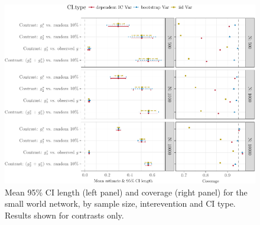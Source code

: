 \documentclass[english]{article}\usepackage[]{graphicx}\usepackage[]{color}
\makeatletter
\def\maxwidth{ %
  \ifdim\Gin@nat@width>\linewidth
    \linewidth
  \else
    \Gin@nat@width
  \fi
}
\newenvironment{knitrout}{}{} %
\theoremstyle{plain}
\theoremstyle{plain}
\makeatother
\begin{document}
\begin{knitrout}\footnotesize
{}\color{fgcolor}\begin{figure}

{\centering \includegraphics[width=\maxwidth]{TablesFigs/knitR-CIres_ATE_smwld-1} 

}

\caption[Mean 95\% CI length (left panel) and coverage (right panel) for the small world network, by sample size, interevention and CI type]{Mean 95\% CI length (left panel) and coverage (right panel) for the small world network, by sample size, interevention and CI type. Results shown for contrasts only.}\label{fig:CIres.ATE.smwld}
\end{figure}


\end{knitrout}
\end{document}
